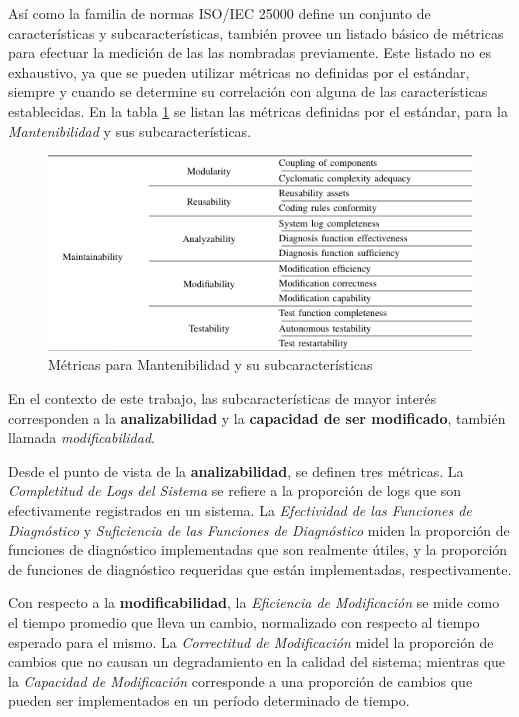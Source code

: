 Así como la familia de normas ISO/IEC 25000 define un conjunto de características y
subcaracterísticas, también provee un listado básico de métricas para efectuar la
medición de las las nombradas previamente.
Este listado no es exhaustivo, ya que se pueden utilizar métricas no definidas por el
estándar, siempre y cuando se determine su correlación con alguna de las características
establecidas.
En la tabla \ref{Metrics} se listan las métricas definidas por el estándar, para la \textit{Mantenibilidad}
y sus subcaracterísticas.

\begin{figure}[H]
    \label{Metrics}
    \includegraphics[width=12cm]{quality_metrics/quality_metrics.png}
    \centering
    \caption{Métricas para Mantenibilidad y su subcaracterísticas}
\end{figure}

En el contexto de este trabajo, las subcaracterísticas de mayor interés corresponden
a la \textbf{analizabilidad} y la \textbf{capacidad de ser modificado}, también llamada
\textit{modificabilidad}.

Desde el punto de vista de la \textbf{analizabilidad}, se definen tres métricas.
La \textit{Completitud de Logs del Sistema} se refiere a la proporción de logs que son
efectivamente registrados en un sistema.
La \textit{Efectividad de las Funciones de Diagnóstico} y \textit{Suficiencia de las
Funciones de Diagnóstico} miden la proporción de funciones de diagnóstico implementadas que
son realmente útiles, y la proporción de funciones de diagnóstico requeridas que están
implementadas, respectivamente.

Con respecto a la \textbf{modificabilidad}, la \textit{Eficiencia de Modificación} se mide
como el tiempo promedio que lleva un cambio, normalizado con respecto al tiempo esperado
para el mismo.
La \textit{Correctitud de Modificación} midel la proporción de cambios que no causan un
degradamiento en la calidad del sistema; mientras que la \textit{Capacidad de Modificación}
corresponde a una proporción de cambios que pueden ser implementados en un período determinado
de tiempo.

